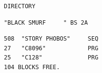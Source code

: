 \begin{description}[leftmargin=2cm,style=nextline]
\begin{tcolorbox}[colback=black,coltext=white]
\verbatimfont{\codefont}
\begin{verbatim}
DIRECTORY
\end{verbatim}
\selectfont{\codefont 0}
\begin{tcolorbox}[colback=white,coltext=black,arc=0mm,boxrule=0mm,
       left*=0.5mm,right*=0mm,top=0mm,bottom=0mm,nobeforeafter,
       left skip=0.5mm,
       width=28mm,height=3mm,valign=center]
\begin{verbatim}
"BLACK SMURF     " BS 2A
\end{verbatim}
\end{tcolorbox}
\begin{verbatim}
508  "STORY PHOBOS"     SEQ
27   "C8096"            PRG
25   "C128"             PRG
104 BLOCKS FREE.
\end{verbatim}
\end{tcolorbox}

\end{description}


\newpage

